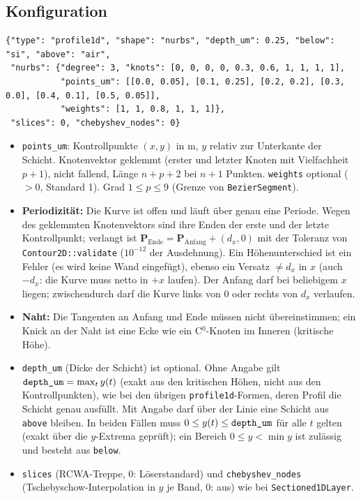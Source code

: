 \subsection{Konfiguration}
{\footnotesize\begin{verbatim}
{"type": "profile1d", "shape": "nurbs", "depth_um": 0.25, "below": "si", "above": "air",
 "nurbs": {"degree": 3, "knots": [0, 0, 0, 0, 0.3, 0.6, 1, 1, 1, 1],
           "points_um": [[0.0, 0.05], [0.1, 0.25], [0.2, 0.2], [0.3, 0.0], [0.4, 0.1], [0.5, 0.05]],
           "weights": [1, 1, 0.8, 1, 1, 1]},
 "slices": 0, "chebyshev_nodes": 0}
\end{verbatim}}
\begin{itemize}[nosep]
  \item \verb|points_um|: Kontrollpunkte $(x,y)$ in \textmu m, $y$ relativ zur Unterkante der Schicht. Knotenvektor
        geklemmt (erster und letzter Knoten mit Vielfachheit $p+1$), nicht fallend, Länge $n+p+2$ bei $n+1$ Punkten.
        \verb|weights| optional ($>0$, Standard 1). Grad $1\le p\le9$ (Grenze von \verb|BezierSegment|).
  \item \textbf{Periodizität:} Die Kurve ist offen und läuft über genau eine Periode. Wegen des geklemmten
        Knotenvektors sind ihre Enden der erste und der letzte Kontrollpunkt; verlangt ist
        $\mathbf P_{\text{Ende}}=\mathbf P_{\text{Anfang}}+(d_x,0)$ mit der Toleranz von \verb|Contour2D::validate|
        ($10^{-12}$ der Ausdehnung). Ein Höhenunterschied ist ein Fehler (es wird keine Wand eingefügt), ebenso ein
        Versatz $\ne d_x$ in $x$ (auch $-d_x$: die Kurve muss netto in $+x$ laufen). Der Anfang darf bei beliebigem
        $x$ liegen; zwischendurch darf die Kurve links von $0$ oder rechts von $d_x$ verlaufen.
  \item \textbf{Naht:} Die Tangenten an Anfang und Ende müssen nicht übereinstimmen; ein Knick an der Naht ist eine
        Ecke wie ein C$^0$-Knoten im Inneren (kritische Höhe).
  \item \verb|depth_um| (Dicke der Schicht) ist optional. Ohne Angabe gilt $\verb|depth_um|=\max_t y(t)$ (exakt
        aus den kritischen Höhen, nicht aus den Kontrollpunkten), wie bei den übrigen \verb|profile1d|-Formen, deren
        Profil die Schicht genau ausfüllt. Mit Angabe darf über der Linie eine Schicht aus \verb|above| bleiben.
        In beiden Fällen muss $0\le y(t)\le\verb|depth_um|$ für alle $t$ gelten (exakt über die $y$-Extrema geprüft);
        ein Bereich $0\le y<\min y$ ist zulässig und besteht aus \verb|below|.
  \item \verb|slices| (RCWA-Treppe, 0: Löserstandard) und \verb|chebyshev_nodes| (Tschebyschow-Interpolation in $y$ je
        Band, 0: aus) wie bei \verb|Sectioned1DLayer|.
\end{itemize}

